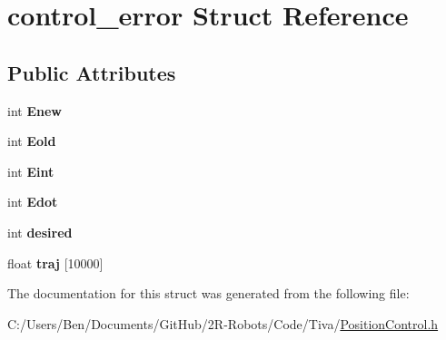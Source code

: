 \hypertarget{structcontrol__error}{}\section{control\+\_\+error Struct Reference}
\label{structcontrol__error}
\subsection*{Public Attributes}
\begin{DoxyCompactItemize}
\item 
\mbox{\label{structcontrol__error_a520d0aa203dfb6a8fc2ef6ea67742634}} 
int {\bfseries Enew}
\item 
\mbox{\label{structcontrol__error_a544db3cda64df9fdd64338941e583d3c}} 
int {\bfseries Eold}
\item 
\mbox{\label{structcontrol__error_a0134001840bac616204e9b36ce7fc53e}} 
int {\bfseries Eint}
\item 
\mbox{\label{structcontrol__error_a5a4f2cb0d9739ecbc2391462d4b0f07d}} 
int {\bfseries Edot}
\item 
\mbox{\label{structcontrol__error_a50083d46933f91ac7af1ab23eda49ddb}} 
int {\bfseries desired}
\item 
\mbox{\label{structcontrol__error_a091f0c902bb50cf5d84f817a1b2c9b5b}} 
float {\bfseries traj} \mbox{[}10000\mbox{]}
\end{DoxyCompactItemize}


The documentation for this struct was generated from the following file\+:\begin{DoxyCompactItemize}
\item 
C\+:/\+Users/\+Ben/\+Documents/\+Git\+Hub/2\+R-\/\+Robots/\+Code/\+Tiva/\mbox{\hyperlink{_position_control_8h}{Position\+Control.\+h}}\end{DoxyCompactItemize}
